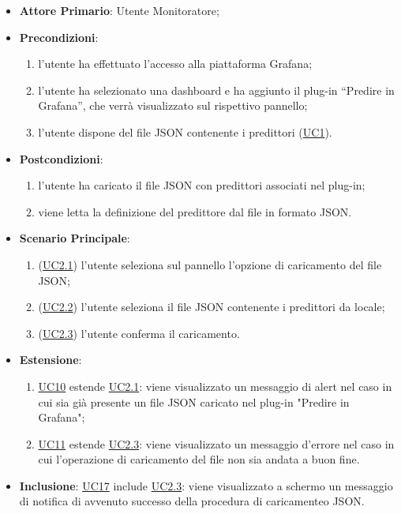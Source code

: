 		\begin{itemize}
			\item\textbf{Attore Primario}: Utente Monitoratore;
			\item\textbf{Precondizioni}: 
				\begin{enumerate}
					\item l’utente ha effettuato l’accesso alla piattaforma Grafana;
					\item l’utente ha selezionato una dashboard e ha aggiunto il plug-in “Predire in Grafana”,  che verrà visualizzato sul rispettivo pannello;
					\item l’utente dispone del file JSON contenente i predittori (\hyperref[par:UC1]{UC1}). 
				\end{enumerate}
			\item\textbf{Postcondizioni}:
				\begin{enumerate}
					\item l’utente ha caricato il file JSON con predittori associati nel plug-in;
					\item viene letta la definizione del predittore dal file in formato JSON. 
				\end{enumerate}
			\item\textbf{Scenario Principale}:
				\begin{enumerate}
					\item (\hyperref[par:UC2.1]{UC2.1}) l'utente seleziona sul pannello l’opzione di caricamento del file JSON; 
					\item (\hyperref[par:UC2.2]{UC2.2}) l’utente seleziona il file JSON contenente i predittori da locale;
					\item (\hyperref[par:UC2.3]{UC2.3}) l'utente conferma il caricamento.
				\end{enumerate}
			\item\textbf{Estensione}:
				\begin{enumerate} 
					\item\hyperref[par:UC10]{UC10} estende \hyperref[par:UC2.1]{UC2.1}: viene visualizzato un messaggio di alert nel caso in cui sia già presente un file JSON caricato nel plug-in "Predire in Grafana";
					\item\hyperref[par:UC11]{UC11} estende \hyperref[par:UC2.3]{UC2.3}: viene visualizzato un messaggio d’errore nel caso in cui l’operazione di caricamento del file non sia andata a buon fine.
				\end{enumerate}	
			\item\textbf{Inclusione}: \hyperref[par:UC17]{UC17} include \hyperref[par:UC2.3]{UC2.3}: viene visualizzato a schermo un messaggio di notifica di avvenuto successo della procedura di caricamenteo JSON.
		\end{itemize}
		
